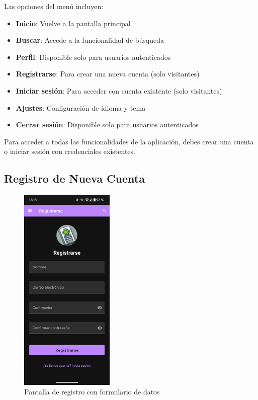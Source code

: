 \documentclass[a4paper,12pt]{report}
\begin{document}
      Las opciones del menú incluyen:
      \begin{itemize}
        \item \textbf{Inicio}: Vuelve a la pantalla principal
        \item \textbf{Buscar}: Accede a la funcionalidad de búsqueda
        \item \textbf{Perfil}: Disponible solo para usuarios autenticados
        \item \textbf{Registrarse}: Para crear una nueva cuenta (solo visitantes)
        \item \textbf{Iniciar sesión}: Para acceder con cuenta existente (solo visitantes)
        \item \textbf{Ajustes}: Configuración de idioma y tema
        \item \textbf{Cerrar sesión}: Disponible solo para usuarios autenticados
      \end{itemize}
    
    
    Para acceder a todas las funcionalidades de la aplicación, debes crear una cuenta o iniciar sesión con credenciales existentes.
    
    \subsection{Registro de Nueva Cuenta}
    
      \begin{figure}[H]
        \centering
        \includegraphics[width=0.4\textwidth]{.img/registro.png}
        \caption{Pantalla de registro con formulario de datos}
        \label{fig:registro}
      \end{figure}
      
\end{document}
